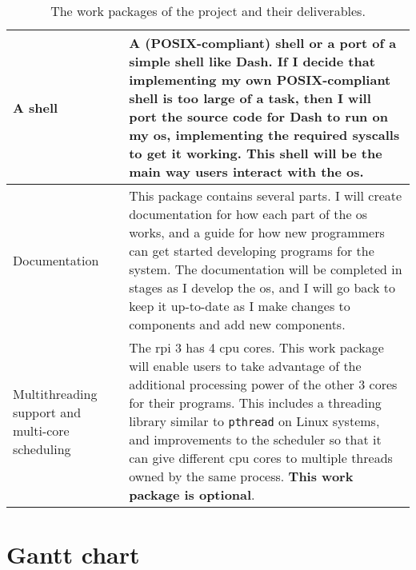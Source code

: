 \documentclass{article}
\begin{document}
\begin{table}[tbp]
\begin{center}
\begin{tabular}{|p{45mm}|p{125mm}|}
    A shell &
    A (POSIX-compliant) shell \textbf{or} a port of a simple shell like
    Dash\cite{dash-shell}. If I decide that implementing my own POSIX-compliant
    shell is too large of a task, then I will port the source code for Dash to
    run on my \gls{os}, implementing the required syscalls to get it working.
    This shell will be the main way users interact with the \gls{os}.
    \\ \hline
    Documentation &
    This package contains several parts. I will create documentation for how
    each part of the \gls{os} works, and a guide for how new programmers can get
    started developing programs for the system. The documentation will be
    completed in stages as I develop the \gls{os}, and I will go back
    to keep it up-to-date as I make changes to components and add new
    components.
    \\ \hline
    Multithreading support and multi-core scheduling &
    The \gls{rpi} 3 has 4 \gls{cpu} cores. This work package will enable users
    to take advantage of the additional processing power of the other 3 cores
    for their programs. This includes a threading library similar to
    \texttt{pthread} on Linux systems, and improvements to the scheduler so
    that it can give different \gls{cpu} cores to multiple threads owned by the
    same process. \textbf{This work package is optional}.
    \\ \hline
\end{tabular}
\caption{The work packages of the project and their deliverables.}
\label{tab:original-work-packages}
\end{center}
\end{table}

\clearpage
\section{Gantt chart}



\printglossaries
\end{document}
